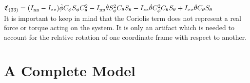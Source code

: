 $\mathfrak{C}_{(33)} = (I_{yy}-I_{zz})   \dot{\phi}  C_{\phi} S_{\phi} C_{\theta}^2 - I_{yy}   \dot{\theta} S_{\phi}^2 C_{\theta} S_{\theta} - I_{zz} \dot{\theta} C_{\phi}^2 C_{\theta} S_{\theta} + I_{xx} \dot{\theta} C_{\theta} S_{\theta}$\\




 It is important to keep in mind that the Coriolis term does not represent a real force or torque acting on the system. It is only an artifact which is needed to account for the relative rotation of one coordinate frame with respect to another.






\section {A Complete Model}



